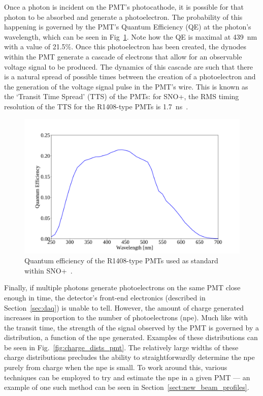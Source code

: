 Once a photon is incident on the PMT's photocathode, it is possible for that photon to be absorbed and generate a photoelectron. The probability of this happening is governed by the PMT's Quantum Efficiency (QE) at the photon's wavelength, which can be seen in Fig~\ref{fig:qe_pmts}. %
Note how the QE is maximal at \SI{439}{\nm} with a value of 21.5\%. Once this photoelectron has been created, the dynodes within the PMT generate a cascade of electrons that allow for an observable voltage signal to be produced. The dynamics of this cascade are such that there is a natural spread of possible times between the creation of a photoelectron and the generation of the voltage signal pulse in the PMT's wire. This is known as the `Transit Time Spread' (TTS) of the PMTs: for SNO+, the RMS timing resolution of the TTS for the R1408-type PMTs is \SI{1.7}{\ns}~\cite{BOGER2000172}. %

\begin{figure}
    \centering
    \includegraphics[width=0.8\linewidth]{2_Detector/Figs/qe_plot.pdf}
    \caption[Quantum efficiency of the R1408-type PMTs used as standard within SNO+]{Quantum efficiency of the R1408-type PMTs used as standard within SNO+~\cite{}. %
    }
    \label{fig:qe_pmts}
\end{figure}

Finally, if multiple photons generate photoelectrons on the same PMT close enough in time, the detector's front-end electronics (described in Section~\ref{sec:daq}) is unable to tell. However, the amount of charge generated increases in proportion to the number of photoelectrons (npe). Much like with the transit time, the strength of the signal observed by the PMT is governed by a distribution, a function of the npe generated. Examples of these distributions can be seen in Fig.~\ref{fig:charge_dists_pmt}. %
The relatively large widths of these charge distributions precludes the ability to straightforwardly determine the npe purely from charge when the npe is small. To work around this, various techniques can be employed to try and estimate the npe in a given PMT --- an example of one such method can be seen in Section~\ref{sect:new_beam_profiles}.


